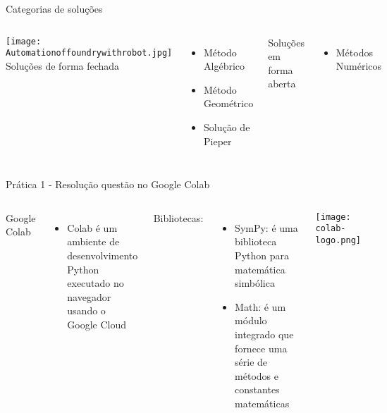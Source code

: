 \begin{frame}[c]{Categorias de soluções}
    \begin{columns}
        \texttt{[image: Automationoffoundrywithrobot.jpg]}
            Soluções de forma fechada
            \begin{itemize} 
                \item Método Algébrico
                \item Método Geométrico
                \item Solução de Pieper
            \end{itemize}
            \singlespacing
            Soluções em forma aberta
            \begin{itemize}
                \item Métodos Numéricos
                 \end{itemize}
    \end{columns}
\end{frame}
\begin{frame}[c]{Prática 1 - Resolução questão no Google Colab}
    \begin{columns}
        Google Colab
        \begin{itemize} 
            \item Colab é um ambiente de desenvolvimento Python executado no 
            navegador usando o Google Cloud
        \end{itemize}
        \singlespacing
        Bibliotecas:
        \begin{itemize}
            \item SymPy: é uma biblioteca Python para matemática simbólica
            \item Math: é um módulo integrado que fornece uma série de métodos e constantes matemáticas
        \end{itemize}
            \centering
            \texttt{[image: colab-logo.png]}
    \end{columns}
\end{frame}
